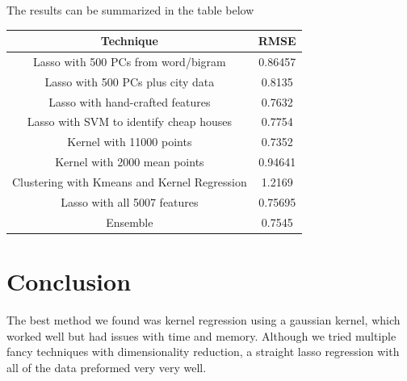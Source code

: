 \documentclass[a4paper,10pt]{article}
\begin{document}
The results can be summarized in the table below
\begin{center}
\begin{tabular}{|c | c|}
\hline
 Technique & RMSE \\ \hline
Lasso with 500 PCs from word/bigram & 0.86457 \\ \hline
Lasso with 500 PCs plus city data & 0.8135 \\ \hline
Lasso with hand-crafted features & 0.7632 \\ \hline
Lasso with SVM to identify cheap houses & 0.7754 \\ \hline
Kernel with 11000 points & 0.7352 \\ \hline
Kernel with 2000 mean points & 0.94641 \\ \hline
Clustering with Kmeans and Kernel Regression & 1.2169\\ \hline
Lasso with all 5007 features & 0.75695 \\ \hline
Ensemble & 0.7545 \\ \hline
\end{tabular}
\end{center}

\section{Conclusion}
The best method we found was kernel regression using a gaussian kernel, which worked well but had issues with time and memory. Although we tried multiple fancy techniques with dimensionality reduction, a straight lasso regression with all of the data preformed very very well.
\end{document}
